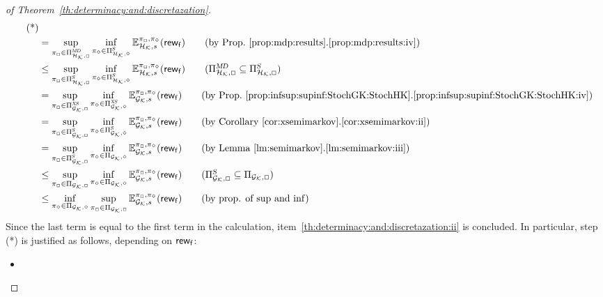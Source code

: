 \begin{proof}[of Theorem~\ref{th:determinacy:and:discretazation}]
\begin{align*}
    \tag{*}\\
    & =
    \sup_{\strat_\maxplay\in\DetMemorylessStrats{\StochHK,\maxplay}}\inf_{\strat_\minplay\in\SemiMarkovStrats{\StochHK,\minplay}}\Expect^{\strat_{\maxplay},\strat_{\minplay}}_{\StochHK,s}(\GRewards)
    \tag{by Prop.~\ref{prop:mdp:results}.\ref{prop:mdp:results:iv}}\\
    & \leq
    \sup_{\strat_\maxplay\in\SemiMarkovStrats{\StochHK,\maxplay}}\inf_{\strat_\minplay\in\SemiMarkovStrats{\StochHK,\minplay}}\Expect^{\strat_{\maxplay},\strat_{\minplay}}_{\StochHK,s}(\GRewards)
    \tag{$\DetMemorylessStrats{\StochHK,\maxplay}\subseteq\SemiMarkovStrats{\StochHK,\maxplay}$}\\
    & =
    \sup_{\strat_\maxplay\in\XSemiMarkovStrats{\StochGK,\maxplay}}\inf_{\strat_\minplay\in\XSemiMarkovStrats{\StochGK,\minplay}}\Expect^{\strat_{\maxplay},\strat_{\minplay}}_{\StochGK,s}(\GRewards)
    \tag{by Prop.~\ref{prop:infsup:supinf:StochGK:StochHK}.\ref{prop:infsup:supinf:StochGK:StochHK:iv}}\\
    & =
    \sup_{\strat_\maxplay\in\SemiMarkovStrats{\StochGK,\maxplay}}\inf_{\strat_\minplay\in\SemiMarkovStrats{\StochGK,\minplay}}\Expect^{\strat_{\maxplay},\strat_{\minplay}}_{\StochGK,s}(\GRewards)
    \tag{by Corollary~\ref{cor:xsemimarkov}.\ref{cor:xsemimarkov:ii}}\\
    & =
    \sup_{\strat_\maxplay\in\SemiMarkovStrats{\StochGK,\maxplay}}\inf_{\strat_\minplay\in\Strategies{\StochGK,\minplay}}\Expect^{\strat_{\maxplay},\strat_{\minplay}}_{\StochGK,s}(\GRewards)
    \tag{by Lemma~\ref{lm:semimarkov}.\ref{lm:semimarkov:iii}}\\
    & 
    \leq
    \sup_{\strat_\maxplay\in\Strategies{\StochGK,\maxplay}}\inf_{\strat_\minplay\in\Strategies{\StochGK,\minplay}}\Expect^{\strat_{\maxplay},\strat_{\minplay}}_{\StochGK,s}(\GRewards)
    \tag{$\SemiMarkovStrats{\StochGK,\maxplay}\subseteq\Strategies{\StochGK,\maxplay}$}\\
    & \leq
    \inf_{\strat_\minplay\in\Strategies{\StochGK,\minplay}}\sup_{\strat_\maxplay\in\Strategies{\StochGK,\maxplay}}\Expect^{\strat_{\maxplay},\strat_{\minplay}}_{\StochGK,s}(\GRewards)
    \tag{by prop. of $\sup$ and $\inf$}
  \end{align*}
  Since the last term is equal to the first term in the calculation,
  item~\ref{th:determinacy:and:discretazation:ii} is concluded.
  In particular, step (*) is justified as follows, depending on
  $\mathsf{rew}_{\mathsf{f}}$:
  \begin{itemize}
  \item%

\end{itemize}
\end{proof}
